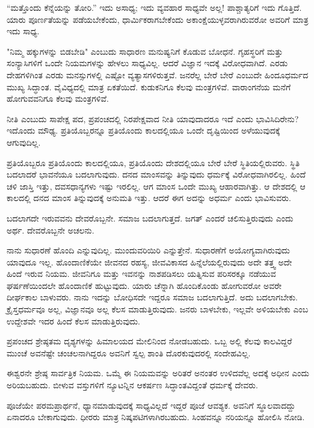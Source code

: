 “ಮತ್ತೊಂದು ಕೆನ್ನೆಯನ್ನು ತೋರಿ.” ಇದು ಅಸಾಧ್ಯ; ಇದು ವ್ಯವಹಾರ ಸಾಧ್ಯವೇ ಅಲ್ಲ! ಪಾಶ್ಚಾತ್ಯರಿಗೆ ಇದು ಗೊತ್ತಿದೆ. ಯಾರು ಪೂರ್ಣತೆಯನ್ನು ಪಡೆಯಬೇಕೆಂದು, ಧಾರ್ಮಿಕರಾಗಬೇಕೆಂದು ಅಕಾಂಕ್ಷೆಯುಳ್ಳವರಾಗಿರುವರೋ ಅವರಿಗೆ ಮಾತ್ರ ಇದು ಸಾಧ್ಯ.

"ನಿಮ್ಮ ಹಕ್ಕುಗಳನ್ನು ಬಿಡಬೇಡಿ" ಎಂಬುದು ಸಾಧಾರಣ ಮನುಷ್ಯನಿಗೆ ಕೊಡುವ ಬೋಧನೆ. ಗೃಹಸ್ಥರಿಗೆ ಮತ್ತು ಸಂನ್ಯಾಸಿಗಳಿಗೆ ಒಂದೇ ನಿಯಮಗಳನ್ನು ಹೇಳಲು ಸಾಧ್ಯವಿಲ್ಲ. ಆದರೆ ವಿಜ್ಞಾನ ಇದಕ್ಕೆ ವಿರೋಧವಾಗಿದೆ. ಎರಡು ದೇಹಗಳಿಗಿಂತ ಎರಡು ಮನಸ್ಸುಗಳಲ್ಲಿ ಎಷ್ಟೋ ವ್ಯತ್ಯಾಸಗಳಿರುತ್ತವೆ. ಜನರೆಲ್ಲ ಬೇರೆ ಬೇರೆ ಎಂಬುದೇ ಹಿಂದೂಧರ್ಮದ ಮುಖ್ಯ ಸಿದ್ಧಾಂತ. ವೈವಿಧ್ಯದಲ್ಲಿ ಮಾತ್ರ ಏಕತೆಯಿದೆ. ಕುಡುಕನಿಗೂ ಕೆಲವು ಮಂತ್ರಗಳಿವೆ. ವಾರಾಂಗನೆಯ ಮನೆಗೆ ಹೋಗುವವನಿಗೂ ಕೆಲವು ಮಂತ್ರಗಳಿವೆ.

ನೀತಿ ಎಂಬುದು ಸಾಪೇಕ್ಷ ಪದ, ಪ್ರಪಂಚದಲ್ಲಿ ನಿರಪೇಕ್ಷವಾದ ನೀತಿ ಯಾವುದಾದರೂ ಇದೆ ಎಂದು ಭಾವಿಸಿದಿರೇನು? ಇದೊಂದು ಮೌಢ್ಯ. ಪ್ರತಿಯೊಬ್ಬರನ್ನೂ ಪ್ರತಿಯೊಂದು ಕಾಲದಲ್ಲಿಯೂ ಒಂದೇ ದೃಷ್ಟಿಯಿಂದ ಅಳೆಯುವುದಕ್ಕೆ ಆಗುವುದಿಲ್ಲ.

ಪ್ರತಿಯೊಬ್ಬರೂ ಪ್ರತಿಯೊಂದು ಕಾಲದಲ್ಲಿಯೂ, ಪ್ರತಿಯೊಂದು ದೇಶದಲ್ಲಿಯೂ ಬೇರೆ ಬೇರೆ ಸ್ಥಿತಿಯಲ್ಲಿರುವರು. ಸ್ಥಿತಿ ಬದಲಾದರೆ ಭಾವನೆಯೂ ಬದಲಾಗುವುದು. ದನದ ಮಾಂಸವನ್ನು ತಿನ್ನುವುದು ಧರ್ಮಕ್ಕೆ ವಿರೋಧವಾಗಿರಲಿಲ್ಲ. ಹಿಂದೆ ಚಳಿ ಜಾಸ್ತಿ ಇತ್ತು, ದವಸಧಾನ್ಯಗಳು ಇಷ್ಟು ಇರಲಿಲ್ಲ. ಆಗ ಮಾಂಸ ಒಂದೇ ಮುಖ್ಯ ಆಹಾರವಾಗಿತ್ತು. ಆ ದೇಶದಲ್ಲಿ ಆ ಕಾಲದಲ್ಲಿ ದನದ ಮಾಂಸ ತಿನ್ನುವುದಕ್ಕೆ ಅನುಮತಿ ಇತ್ತು. ಆದರೆ ಈಗ ಅದನ್ನು ಅಧರ್ಮ ಎಂದು ಭಾವಿಸುವರು.

ಬದಲಾಗದೇ ಇರುವವನು ದೇವರೊಬ್ಬನೇ. ಸಮಾಜ ಬದಲಾಗುತ್ತದೆ. ಜಗತ್ ಎಂದರೆ ಚಲಿಸುತ್ತಿರುವುದು ಎಂದು ಅರ್ಥ. ದೇವರೊಬ್ಬನೇ ಅಚಲನು.

ನಾನು ಸುಧಾರಣೆ ಹೊಂದಿ ಎನ್ನುವುದಿಲ್ಲ. ಮುಂದುವರಿಯಿರಿ ಎನ್ನುತ್ತೇನೆ. ಸುಧಾರಣೆಗೆ ಅಯೋಗ್ಯವಾಗಿರುವುದು ಯಾವುದೂ ಇಲ್ಲ. ಹೊಂದಾಣಿಕೆಯೇ ಜೀವನದ ರಹಸ್ಯ, ಜೀವವಿಕಾಸದ ಹಿನ್ನೆಲೆಯಲ್ಲಿರುವುದು ಅದೇ ತತ್ತ್ವ ಅದೇ ಹಿಂದೆ ಇರುವ ನಿಯಮ. ಜೀವನಿಗೂ ಮತ್ತು ಇವನನ್ನು ನಾಶಪಡಿಸಲು ಯತ್ನಿಸುವ ಪರಿಸರಕ್ಕೂ ನಡೆಯುವ ಘರ್ಷಣೆಯಿಂದಲೇ ಹೊಂದಾಣಿಕೆ ಹುಟ್ಟುವುದು. ಯಾರು ಚೆನ್ನಾಗಿ ಹೊಂದಿಕೊಂಡು ಹೋಗುವರೋ ಅವರೇ ದೀರ್ಘಕಾಲ ಬಾಳುವರು. ನಾನು ಇದನ್ನು ಬೋಧಿಸದೇ ಇದ್ದರೂ ಸಮಾಜ ಬದಲಾಗುತ್ತಿದೆ. ಅದು ಬದಲಾಗಬೇಕು. ಕ್ರೈಸ್ತಧರ್ಮವೂ ಅಲ್ಲ, ವಿಜ್ಞಾನವೂ ಅಲ್ಲ ಕೆಲಸ ಮಾಡುತ್ತಿರುವುದು. ಜನರು ಬಾಳಬೇಕು, ಇಲ್ಲವೇ ಅಳಿಯಬೇಕು ಎಂಬ ಉದ್ದೇಶವೇ ಇದರ ಹಿಂದೆ ಕೆಲಸ ಮಾಡುತ್ತಿರುವುದು.

ಪ್ರಪಂಚದ ಶ್ರೇಷ್ಠತಮ ದೃಶ್ಯಗಳನ್ನು ಹಿಮಾಲಯದ ಮೇಲಿನಿಂದ ನೋಡಬಹುದು. ಒಬ್ಬ ಅಲ್ಲಿ ಕೆಲವು ಕಾಲವಿದ್ದರೆ ಮುಂಚೆ ಅವನೆಷ್ಟೇ ಚಂಚಲನಾಗಿದ್ದರೂ ಅವನಿಗೆ ಸ್ವಲ್ಪ ಶಾಂತಿ ದೊರಕುವುದರಲ್ಲಿ ಸಂದೇಹವಿಲ್ಲ.

ಈಶ್ವರನೇ ಶ್ರೇಷ್ಠ ಸಾರ್ವತ್ರಿಕ ನಿಯಮ. ಒಮ್ಮೆ ಈ ನಿಯಮವನ್ನು ಅರಿತರೆ ಅನಂತರ ಉಳಿದವೆಲ್ಲ ಅದಕ್ಕೆ ಅಧೀನ ಎಂದು ಅರಿಯಬಹುದು. ಬೀಳುವ ವಸ್ತುಗಳಿಗೆ ನ್ಯೂಟನ್ನಿನ ಆಕರ್ಷಣ ಸಿದ್ಧಾಂತವಿದ್ದಂತೆ ಧರ್ಮಕ್ಕೆ ದೇವರು.

ಪೂಜೆಯೇ ಪರಮಪ್ರಾರ್ಥನೆ, ಧ್ಯಾನಮಾಡುವುದಕ್ಕೆ ಸಾಧ್ಯವಿಲ್ಲದೆ ಇದ್ದರೆ ಪೂಜೆ ಆವಶ್ಯಕ. ಅವನಿಗೆ ಸ್ಥೂಲವಾದದ್ದು ಏನಾದರೂ ಬೇಕಾಗುವುದು. ಧೀರರು ಮಾತ್ರ ನಿಷ್ಕಪಟಿಗಳಾಗಿರಬಹುದು. ಸಿಂಹವನ್ನೂ ನರಿಯನ್ನೂ ಹೋಲಿಸಿ ನೋಡಿ.

